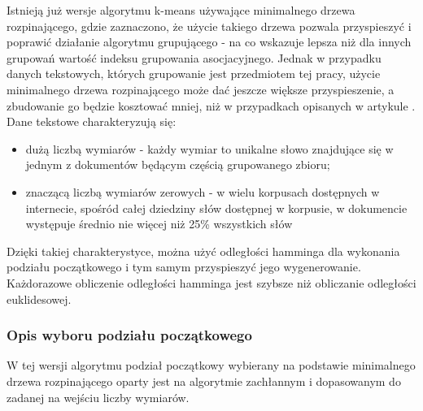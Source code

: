 \documentclass{article}
\begin{document}
Istnieją już wersje algorytmu k-means używające minimalnego drzewa rozpinającego,  gdzie zaznaczono, że użycie takiego drzewa pozwala przyspieszyć i poprawić działanie algorytmu grupującego - na co wskazuje lepsza niż dla innych grupowań wartość indeksu grupowania asocjacyjnego. Jednak w przypadku danych tekstowych, których grupowanie jest przedmiotem tej pracy, użycie minimalnego drzewa rozpinającego może dać jeszcze większe przyspieszenie, a zbudowanie go będzie kosztować mniej, niż w przypadkach opisanych w artykule . 
Dane tekstowe charakteryzują się:
\begin{itemize}
	\item dużą liczbą wymiarów - każdy wymiar to unikalne słowo znajdujące się w jednym z dokumentów będącym częścią grupowanego zbioru;
	\item znaczącą liczbą wymiarów zerowych - w wielu korpusach dostępnych w internecie, spośród całej dziedziny słów dostępnej w korpusie, w dokumencie występuje średnio nie więcej niż 25\% wszystkich słów 
\end{itemize}
Dzięki takiej charakterystyce, można użyć odległości hamminga dla wykonania podziału początkowego i tym samym przyspieszyć jego wygenerowanie. Każdorazowe obliczenie odległości hamminga jest szybsze niż obliczanie odległości euklidesowej.

\subsubsection{Opis wyboru podziału początkowego}

W tej wersji algorytmu podział początkowy wybierany na podstawie minimalnego drzewa rozpinającego oparty jest na algorytmie zachłannym i dopasowanym do zadanej na wejściu liczby wymiarów.
\end{document}

